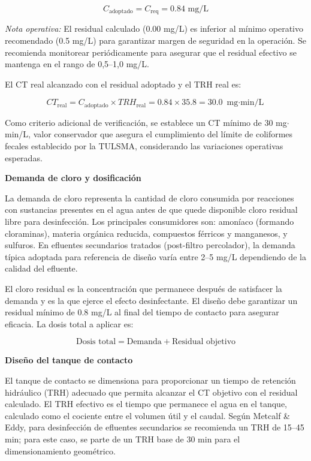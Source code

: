 \documentclass[12pt,a4paper]{article}
\begin{document}
\begin{equation}
C_{\text{adoptado}} = C_{\text{req}} = 0.84 \text{ mg/L}
\end{equation}

\textit{Nota operativa:} El residual calculado (0.00 mg/L) es inferior al mínimo operativo recomendado (0.5 mg/L) para garantizar margen de seguridad en la operación. Se recomienda monitorear periódicamente para asegurar que el residual efectivo se mantenga en el rango de 0,5--1,0 mg/L.

El CT real alcanzado con el residual adoptado y el TRH real es:

\begin{equation}
CT_{\text{real}} = C_{\text{adoptado}} \times TRH_{\text{real}} = 0.84 \times 35.8 = 30.0 \text{ mg$\cdot$min/L}
\end{equation}

Como criterio adicional de verificación, se establece un CT mínimo de 30 mg$\cdot$min/L, valor conservador que asegura el cumplimiento del límite de coliformes fecales establecido por la TULSMA, considerando las variaciones operativas esperadas.

\textbf{Demanda de cloro y dosificación}

La demanda de cloro representa la cantidad de cloro consumida por reacciones con sustancias presentes en el agua antes de que quede disponible cloro residual libre para desinfección. Los principales consumidores son: amoníaco (formando cloraminas), materia orgánica reducida, compuestos férricos y manganesos, y sulfuros. En efluentes secundarios tratados (post-filtro percolador), la demanda típica adoptada para referencia de diseño varía entre 2--5 mg/L dependiendo de la calidad del efluente.

El cloro residual es la concentración que permanece después de satisfacer la demanda y es la que ejerce el efecto desinfectante. El diseño debe garantizar un residual mínimo de 0.8 mg/L al final del tiempo de contacto para asegurar eficacia. La dosis total a aplicar es:

\begin{equation}
\text{Dosis total} = \text{Demanda} + \text{Residual objetivo}
\end{equation}

\textbf{Diseño del tanque de contacto}

El tanque de contacto se dimensiona para proporcionar un tiempo de retención hidráulico (TRH) adecuado que permita alcanzar el CT objetivo con el residual calculado. El TRH efectivo es el tiempo que permanece el agua en el tanque, calculado como el cociente entre el volumen útil y el caudal. Según Metcalf \& Eddy, para desinfección de efluentes secundarios se recomienda un TRH de 15--45 min; para este caso, se parte de un TRH base de 30 min para el dimensionamiento geométrico.
\end{document}
